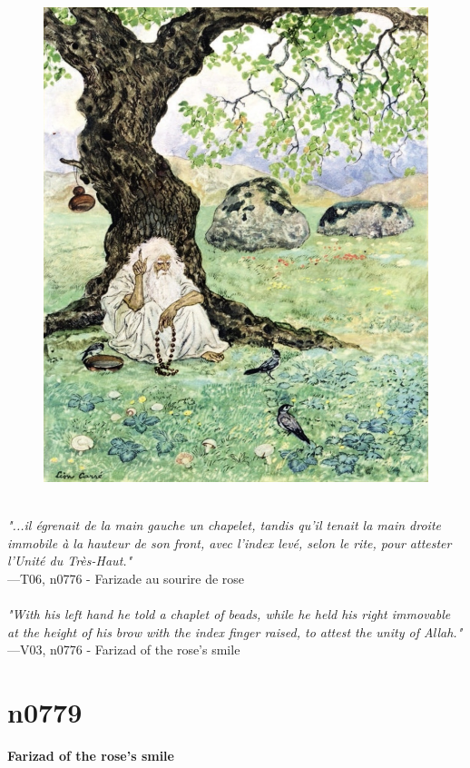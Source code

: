 \documentclass[../Carre_nights.tex]{subfiles}
\begin{document}
\begin{figure}[ht]
\centering
\includegraphics[height=\figsize]{illustrations/volume_6/T06, n0776 - Farizade au sourire de rose.jpg}
\end{figure}

\textit{\\
"...il égrenait de la main gauche un chapelet, tandis qu’il tenait la main droite immobile à la hauteur de son front, avec l’index levé, selon le rite, pour attester l’Unité du Très-Haut."} \\
—T06, n0776 - Farizade au sourire de rose \\~\\
\textit{"With his left hand he told a chaplet of beads, while he held his right immovable at the height of his brow with the index finger raised, to attest the unity of Allah."} \\
—V03, n0776 - Farizad of the rose’s smile

\newpage

\section{n0779}
\textbf{\Large{Farizad of the rose’s smile}} \\
\end{document}
